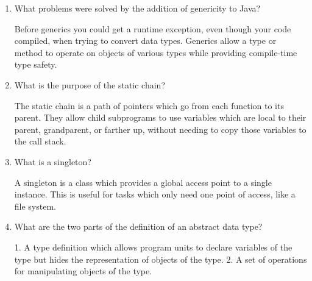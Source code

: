 \begin{enumerate}
  \item What problems were solved by the addition
    of genericity to Java?

  \begin{answer}
  Before generics you could get a runtime exception, even though your code compiled, when trying to convert data types. Generics allow a type or method to operate on objects of various types while providing compile-time type safety.
  \end{answer}

  \item What is the purpose of the static chain?

  \begin{answer}
  The static chain is a path of pointers which go from each function to its parent. They allow child subprograms to use variables which are local to their parent, grandparent, or farther up, without needing to copy those variables to the call stack.
  \end{answer}

  \item What is a singleton?

  \begin{answer}
  A singleton is a class which provides a global access point to a single instance. This is useful for tasks which only need one point of access, like a file system.
  \end{answer}

  \item What are the two parts of the definition 
    of an abstract data type?

  \begin{answer}
    1. A type definition which allows program units to declare variables of the type but hides the representation of objects of the type. 2. A set of operations for manipulating objects of the type.
  \end{answer}
  \end{enumerate}


